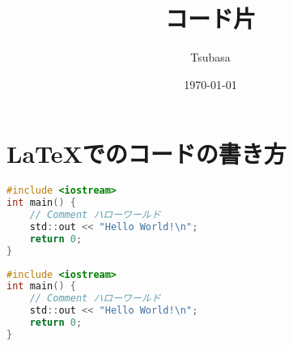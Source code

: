 \documentclass[a4paper]{ltjsarticle}
\begin{document}
\title{コード片}
\author{Tsubasa}
\date{\today}
\maketitle

\section{\LaTeX でのコードの書き方}


{
\begin{lstlisting}[caption=モノクロ, language=c]
#include <iostream>
int main() {
    // Comment ハローワールド
    std::out << "Hello World!\n";
    return 0;
}
\end{lstlisting}
}

\begin{lstlisting}[caption=カラー, language=c]
#include <iostream>
int main() {
    // Comment ハローワールド
    std::out << "Hello World!\n";
    return 0;
}
\end{lstlisting}

\end{document}
